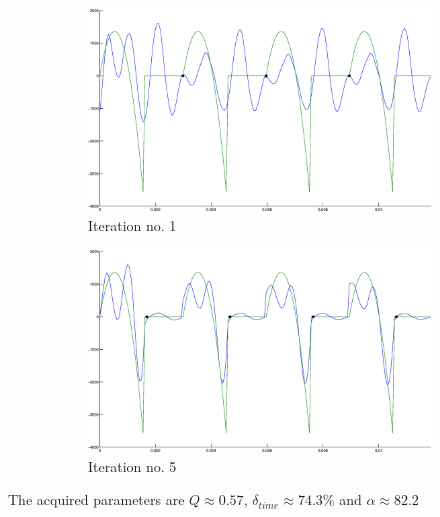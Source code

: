 \documentclass[12pt,a4]{article}
\begin{document}
\begin{figure}[H]
 \begin{subfigure}{.47\textwidth}
  \includegraphics[width=\textwidth]{img/Roope-1.eps}
  \caption{Iteration no. 1}
 \end{subfigure}%
 \hspace{.05\textwidth}
 \begin{subfigure}{.47\textwidth}
  \includegraphics[width=\textwidth]{img/Roope-5.eps}
  \caption{Iteration no. 5}
 \end{subfigure}
 \caption{}\label{fig:realData1}
 \end{figure}
 The acquired parameters are $Q \approx 0.57$, $\delta_{time} \approx 74.3\%$ and $\alpha \approx 82.2$ 
  

\null
\end{document}
